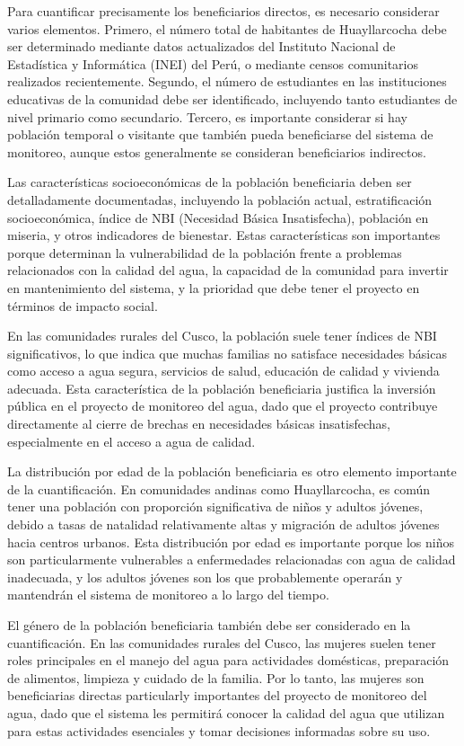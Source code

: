 Para cuantificar precisamente los beneficiarios directos, es necesario considerar varios elementos. Primero, el número total de habitantes de Huayllarcocha debe ser determinado mediante datos actualizados del Instituto Nacional de Estadística y Informática (INEI) del Perú, o mediante censos comunitarios realizados recientemente. Segundo, el número de estudiantes en las instituciones educativas de la comunidad debe ser identificado, incluyendo tanto estudiantes de nivel primario como secundario. Tercero, es importante considerar si hay población temporal o visitante que también pueda beneficiarse del sistema de monitoreo, aunque estos generalmente se consideran beneficiarios indirectos.

Las características socioeconómicas de la población beneficiaria deben ser detalladamente documentadas, incluyendo la población actual, estratificación socioeconómica, índice de NBI (Necesidad Básica Insatisfecha), población en miseria, y otros indicadores de bienestar. Estas características son importantes porque determinan la vulnerabilidad de la población frente a problemas relacionados con la calidad del agua, la capacidad de la comunidad para invertir en mantenimiento del sistema, y la prioridad que debe tener el proyecto en términos de impacto social.

En las comunidades rurales del Cusco, la población suele tener índices de NBI significativos, lo que indica que muchas familias no satisface necesidades básicas como acceso a agua segura, servicios de salud, educación de calidad y vivienda adecuada. Esta característica de la población beneficiaria justifica la inversión pública en el proyecto de monitoreo del agua, dado que el proyecto contribuye directamente al cierre de brechas en necesidades básicas insatisfechas, especialmente en el acceso a agua de calidad.

La distribución por edad de la población beneficiaria es otro elemento importante de la cuantificación. En comunidades andinas como Huayllarcocha, es común tener una población con proporción significativa de niños y adultos jóvenes, debido a tasas de natalidad relativamente altas y migración de adultos jóvenes hacia centros urbanos. Esta distribución por edad es importante porque los niños son particularmente vulnerables a enfermedades relacionadas con agua de calidad inadecuada, y los adultos jóvenes son los que probablemente operarán y mantendrán el sistema de monitoreo a lo largo del tiempo.

El género de la población beneficiaria también debe ser considerado en la cuantificación. En las comunidades rurales del Cusco, las mujeres suelen tener roles principales en el manejo del agua para actividades domésticas, preparación de alimentos, limpieza y cuidado de la familia. Por lo tanto, las mujeres son beneficiarias directas particularly importantes del proyecto de monitoreo del agua, dado que el sistema les permitirá conocer la calidad del agua que utilizan para estas actividades esenciales y tomar decisiones informadas sobre su uso.

